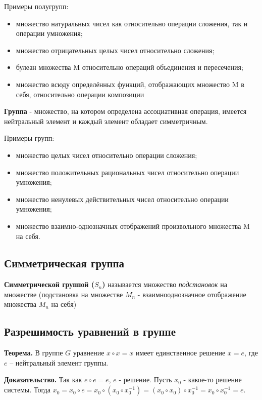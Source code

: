 \documentclass[a4paper]{article}
\begin{document}
    Примеры полугрупп:
    \begin{itemize}
        \item множество натуральных чисел как относительно операции сложения, так и
        операции умножения;
        \item множество отрицательных целых чисел относительно сложения;
        \item булеан множества M относительно операций объединения и пересечения;
        \item множество всюду определённых функций, отображающих множество M в
        себя, относительно операции композиции
    \end{itemize}

    \textbf{Группа} - множество, на котором определена ассоциативная операция, имеется нейтральный элемент и каждый элемент обладает симметричным.

    Примеры групп:
    \begin{itemize}
        \item множество целых чисел относительно операции сложения;
        \item множество положительных рациональных чисел относительно операции
        умножения;
        \item множество ненулевых действительных чисел относительно операции
        умножения;
        \item множество взаимно-однозначных отображений произвольного множества M на себя.
    \end{itemize}

    \subsection*{Симметрическая группа}
    \textbf{Симметрической группой ($S_n$)} называется множество \textit{подстановок} на множестве (подстановка на множестве $M_n$ - взаимнооднозначное отображение множества $M_n$ на себя)

    \subsection*{Разрешимость уравнений в группе
    }
    \begin{htheorem}
        \textbf{Теорема.}  В группе  $G$ уравнение $x \circ x = x$ имеет
        единственное решение $x = e$, где $e$ – нейтральный элемент группы.
    \end{htheorem}

    \begin{hproof}
        \textbf{Доказательство.} Так как $e \circ e = e$, $e$ - решение. Пусть $x_0$ - какое-то решение системы. Тогда $x_0 = x_0 \circ e = x_0 \circ (x_0 \circ x_0^{-1}) = (x_0 \circ x_0) \circ x_0^{-1} = x_0 \circ x_0^{-1} = e$.
    \end{hproof}
\end{document}
